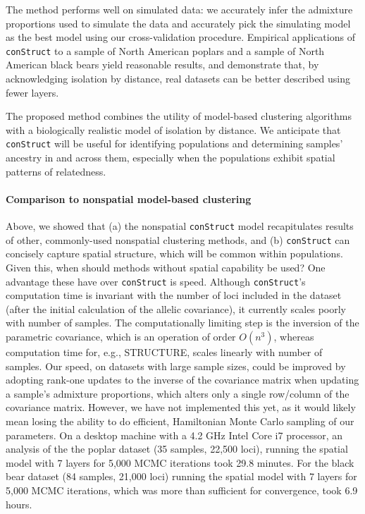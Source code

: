 \documentclass[12pt]{article}
\begin{document}
The method performs well on simulated data:
we accurately infer the admixture proportions used to simulate the data 
and accurately pick the simulating model as the best model using our cross-validation procedure.
Empirical applications of \texttt{conStruct} to a sample of North American poplars 
and a sample of North American black bears yield reasonable results,
and demonstrate that,
by acknowledging isolation by distance,
real datasets can be better described using fewer layers.

The proposed method combines the utility of model-based clustering algorithms 
with a biologically realistic model of isolation by distance.
We anticipate that \texttt{conStruct} will be useful for identifying populations 
and determining samples' ancestry in and across them, 
especially when the populations exhibit spatial patterns of relatedness.

\paragraph{Comparison to nonspatial model-based clustering}
Above, we showed that 
(a) the nonspatial \texttt{conStruct} model recapitulates results of 
other, commonly-used nonspatial clustering methods,
and 
(b) \texttt{conStruct} can concisely capture spatial structure, which
will be common within populations.
Given this, when should methods without spatial capability be used?
One advantage these have over \texttt{conStruct} is speed.
Although \texttt{conStruct}'s computation time is invariant 
with the number of loci included in the dataset 
(after the initial calculation of the allelic covariance), 
it currently scales poorly with number of samples.
The computationally limiting step is the inversion of the parametric covariance, 
which is an operation of order $O(n^3)$, 
whereas computation time for, e.g., STRUCTURE, 
scales linearly with number of samples.
Our speed, on datasets with large sample sizes, 
could be improved by adopting rank-one updates 
to the inverse of the covariance matrix 
\citep[e.g.][]{woodbury1950,sherman_morrison1950}
when updating a sample's admixture proportions, 
which alters only a single row/column of the covariance matrix. 
However, we have not implemented this yet, 
as it would likely mean losing the ability to do efficient,  
Hamiltonian Monte Carlo sampling of our parameters.
On a desktop machine with a 4.2 GHz Intel Core i7 processor, 
an analysis of the the poplar dataset (35 samples, 22,500 loci), 
running the spatial model with 7 layers for 5,000 MCMC iterations 
took 29.8 minutes.
For the black bear dataset (84 samples, 21,000 loci) 
running the spatial model with 7 layers for 5,000 MCMC iterations, 
which was more than sufficient for convergence,
took 6.9 hours.
\end{document}
